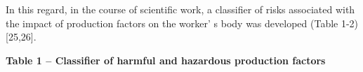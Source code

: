 {In this regard, in the course of scientific work, a classifier of risks
associated with the impact of production factors on the
worker' s body was developed (Table 1-2) {[}25,26{]}.

{\bfseries Table 1 -- Classifier of harmful and hazardous production
factors}

% 
% 
% 
}
